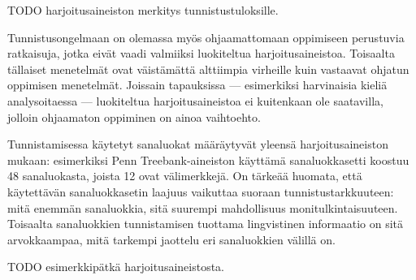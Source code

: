 \documentclass[utf8,bachelor,manualbib]{gradu3}
\begin{document}
TODO harjoitusaineiston merkitys tunnistustuloksille.

Tunnistusongelmaan on olemassa myös ohjaamattomaan oppimiseen perustuvia ratkaisuja, jotka eivät vaadi valmiiksi luokiteltua harjoitusaineistoa. Toisaalta tällaiset menetelmät ovat väistämättä alttiimpia virheille kuin vastaavat ohjatun oppimisen menetelmät. Joissain tapauksissa --- esimerkiksi harvinaisia kieliä analysoitaessa --- luokiteltua harjoitusaineistoa ei kuitenkaan ole saatavilla, jolloin ohjaamaton oppiminen on ainoa vaihtoehto.

Tunnistamisessa käytetyt sanaluokat määräytyvät yleensä harjoitusaineiston mukaan: esimerkiksi Penn Treebank-aineiston käyttämä sanaluokkasetti koostuu 48 sanaluokasta, joista 12 ovat välimerkkejä. On tärkeää huomata, että käytettävän sanaluokkasetin laajuus vaikuttaa suoraan tunnistustarkkuuteen: mitä enemmän sanaluokkia, sitä suurempi mahdollisuus monitulkintaisuuteen. Toisaalta sanaluokkien tunnistamisen tuottama lingvistinen informaatio on sitä arvokkaampaa, mitä tarkempi jaottelu eri sanaluokkien välillä on. \citep{marcus1993}

TODO esimerkkipätkä harjoitusaineistosta.
\end{document}
